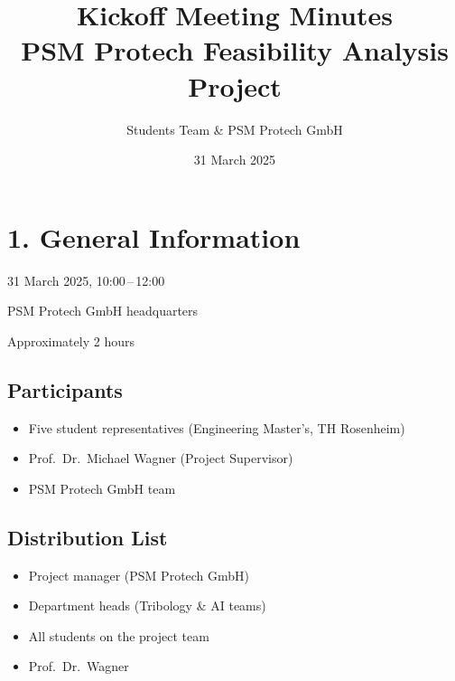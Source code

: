 \documentclass[a4paper,12pt]{article}
\title{\Large\bfseries Kickoff Meeting Minutes\\[0.5ex]
       \normalfont PSM Protech Feasibility Analysis Project}
\author{Students Team \& PSM Protech GmbH}
\date{31 March 2025}
\begin{document}
\maketitle

\section*{1. General Information}
\begin{description}[leftmargin=!,labelwidth=\widthof{\bfseries Duration:}]
  \item[Date \& Time:] 31 March 2025, 10:00\,--\,12:00
  \item[Location:] PSM Protech GmbH headquarters
  \item[Duration:] Approximately 2 hours
\end{description}

\subsection*{Participants}
\begin{itemize}[noitemsep]
  \item Five student representatives (Engineering Master’s, TH Rosenheim)
  \item Prof.\ Dr.\ Michael Wagner (Project Supervisor)
  \item PSM Protech GmbH team
\end{itemize}

\subsection*{Distribution List}
\begin{itemize}[noitemsep]
  \item Project manager (PSM Protech GmbH)
  \item Department heads (Tribology \& AI teams)
  \item All students on the project team
  \item Prof.\ Dr.\ Wagner
\end{itemize}
\end{document}
